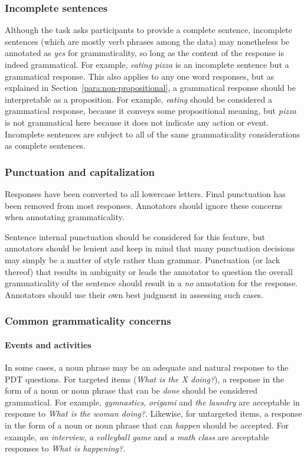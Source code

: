 \documentclass[12pt,notitlepage]{article}
\begin{document}
\subsubsection{Incomplete sentences} \label{subsubsec:gram-incomplete-sentences} Although the task asks participants to provide a complete sentence, incomplete sentences (which are mostly verb phrases among the data) may nonetheless be annotated as \textit{yes} for grammaticality, so long as the content of the response is indeed grammatical. For example, \textit{eating pizza} is an incomplete sentence but a grammatical response. This also applies to any one word responses, but as explained in Section~\ref{para:non-propositional}, a grammatical response should be interpretable as a proposition. For example, \textit{eating} should be considered a grammatical response, because it conveys some propositional meaning, but \textit{pizza} is not grammatical here because it does not indicate any action or event. Incomplete sentences are subject to all of the same grammaticality considerations as complete sentences.

\subsubsection{Punctuation and capitalization} Responses have been converted to all lowercase letters. Final punctuation has been removed from most responses. Annotators should ignore these concerns when annotating grammaticality. 

Sentence internal punctuation should be considered for this feature, but annotators should be lenient and keep in mind that many punctuation decisions may simply be a matter of style rather than grammar. Punctuation (or lack thereof) that results in ambiguity or leads the annotator to question the overall grammaticality of the sentence should result in a \textit{no} annotation for the response. Annotators should use their own best judgment in assessing such cases.

\subsubsection{Common grammaticality concerns}

\paragraph{Events and activities}
\label{para:gram-events} In some cases, a noun phrase may be an adequate and natural response to the PDT questions. For targeted items (\textit{What is the X doing?}), a response in the form of a noun or noun phrase that can be \textit{done} should be considered grammatical. For example, \textit{gymnastics}, \textit{origami} and \textit{the laundry} are acceptable in response to \textit{What is the woman doing?}. Likewise, for untargeted items, a response in the form of a noun or noun phrase that can \textit{happen} should be accepted. For example, \textit{an interview}, \textit{a volleyball game} and \textit{a math class} are acceptable responses to \textit{What is happening?}.
\end{document}
